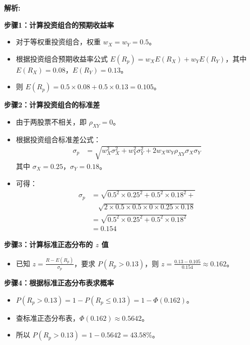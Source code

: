 \documentclass{article}
\newenvironment{explanation}
{\textbf{解析:}\par}
{\par}
\begin{document}
        \begin{explanation}
        \textbf{步骤1：计算投资组合的预期收益率}
        \begin{itemize}
            \item 对于等权重投资组合，权重 \(w_X = w_Y=0.5\)。
            \item 根据投资组合预期收益率公式 \(E(R_p)=w_XE(R_X)+w_YE(R_Y)\)，其中 \(E(R_X) = 0.08\)，\(E(R_Y)=0.13\)。
            \item 则 \(E(R_p)=0.5\times0.08 + 0.5\times0.13=0.105\)。
        \end{itemize}
        \textbf{步骤2：计算投资组合的标准差}
        \begin{itemize}
            \item 由于两股票不相关，即 \(\rho_{XY}=0\)。
            \item 根据投资组合标准差公式：
            \begin{align*}
            \sigma_p &= \sqrt{w_X^{2}\sigma_X^{2}+w_Y^{2}\sigma_Y^{2}+2w_Xw_Y\rho_{XY}\sigma_X\sigma_Y}
            \end{align*}
            其中 \(\sigma_X = 0.25\)，\(\sigma_Y = 0.18\)。
            \item 可得：
            \begin{align*}
            \sigma_p &= \sqrt{0.5^{2}\times0.25^{2}+0.5^{2}\times0.18^{2} + {}} \\
                     &\quad \sqrt{2\times0.5\times0.5\times0\times0.25\times0.18} \\
                     &= \sqrt{0.5^{2}\times0.25^{2}+0.5^{2}\times0.18^{2}} \\
                     &= 0.154
            \end{align*}
        \end{itemize}
        \textbf{步骤3：计算标准正态分布的 \(z\) 值}
        \begin{itemize}
            \item 已知 \(z=\frac{R - E(R_p)}{\sigma_p}\)，要求 \(P(R_p>0.13)\)，则 \(z=\frac{0.13 - 0.105}{0.154}\approx0.162\)。
        \end{itemize}
        \textbf{步骤4：根据标准正态分布表求概率}
        \begin{itemize}
            \item \(P(R_p>0.13)=1 - P(R_p\leq0.13)=1-\varPhi(0.162)\)。
            \item 查标准正态分布表，\(\varPhi(0.162)\approx0.5642\)。
            \item 所以 \(P(R_p>0.13)=1 - 0.5642 = 43.58\%\)。
        \end{itemize}
        \end{explanation}
        
\end{document}
